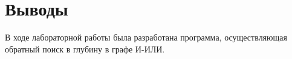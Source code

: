 \chapter*{Выводы}

В ходе лабораторной работы была разработана программа, осуществляющая обратный поиск в глубину в графе И-ИЛИ.
